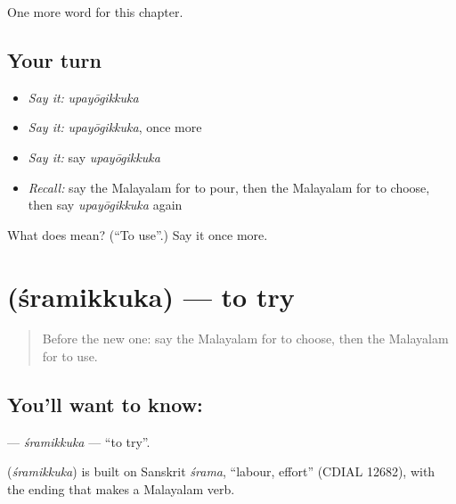 \begin{grammarlens}[title={What you've built}]
One more word for this chapter.
\end{grammarlens}

\subsection*{Your turn}
\begin{itemize}
\raggedright
  \item \emph{Say it:} \emph{upayōgikkuka}
  \item \emph{Say it:} \emph{upayōgikkuka}, once more
  \item \emph{Say it:} say \emph{upayōgikkuka}
  \item \emph{Recall:} say the Malayalam for to pour, then the Malayalam for to choose, then say \emph{upayōgikkuka} again
\end{itemize}

\begin{tcolorbox}[breakable,colback=teal!4,colframe=teal!35!black,title={Before you move on}]
What does  mean? (\textquotedblleft{}To use\textquotedblright{}.) Say it once more.
\end{tcolorbox}
\section[\texorpdfstring{\ml{ശ്രമിക്കുക} (śramikkuka)}{ശ്രമിക്കുക (śramikkuka)}]{ (śramikkuka) — to try}

\label{lesson:ML-C183-sramikkuka}



\begin{quote}
Before the new one: say the Malayalam for to choose, then the Malayalam for to use.
\end{quote}

\subsection*{You'll want to know: }
\textbf{} — \emph{śramikkuka} — \textquotedblleft{}to try\textquotedblright{}.

\begin{cousinweb}
\textbf{} (\emph{śramikkuka}) is built on Sanskrit \emph{śrama}, \textquotedblleft{}labour, effort\textquotedblright{} (CDIAL 12682), with the ending that makes a Malayalam verb.
\end{cousinweb}

